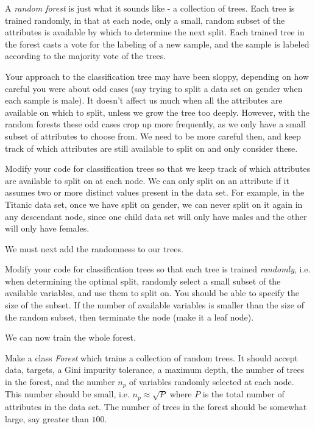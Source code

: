 
A \emph{random forest} is just what it sounds like - a collection of trees. Each tree is trained randomly, in that at each node, only a small, random subset of the attributes is available by which to determine the next split. Each trained tree in the forest casts a vote for the labeling of a new sample, and the sample is labeled according to the majority vote of the trees.

Your approach to the classification tree may have been sloppy, depending on how careful you were about odd cases (say trying to split a data set on gender when each sample is male). It doesn't affect us much when all the attributes are available on which to split, unless we grow the tree too deeply. However, with the random forests these odd cases crop up more frequently, as we only have a small subset of attributes to choose from. We need to be more careful then, and keep track of which attributes are still available to split on and only consider these.

\begin{problem}
Modify your code for classification trees so that we keep track of which attributes are available to split on at each node. We can only split on an attribute if it assumes two or more distinct values present in the data set. For example, in the Titanic data set, once we have split on gender, we can never split on it again in any descendant node, since one child data set will only have males and the other will only have females.
\end{problem}

We must next add the randomness to our trees.

\begin{problem}
Modify your code for classification trees so that each tree is trained \emph{randomly}, i.e. when determining the optimal split, randomly select a small subset of the available variables, and use them to split on. You should be able to specify the size of the subset. If the number of available variables is smaller than the size of the random subset, then terminate the node (make it a leaf node).
\end{problem}

We can now train the whole forest.

\begin{problem}
Make a class \emph{Forest} which trains a collection of random trees. It should accept data, targets, a Gini impurity tolerance, a maximum depth, the number of trees in the forest, and the number $n_{p}$ of variables randomly selected at each node. This number should be small, i.e. $n_{p} \approx \sqrt{P}$ where $P$ is the total number of attributes in the data set. The number of trees in the forest should be somewhat large, say greater than $100$.
\end{problem}

